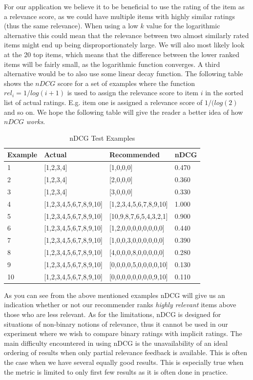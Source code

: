 For our application we believe it to be beneficial to use the rating of the item as a
relevance score, as we could have multiple items with highly similar ratings (thus the same relevance). When using a low $k$ value for the logarithmic alternative this could mean that the relevance between two almost similarly rated items might end up being disproportionately large. We will also most likely look at the 20 top items, which means that the difference between the lower ranked items will be fairly small, as the logarithmic function converges. A third alternative would be to also use some linear decay function. The following table shows the $nDCG$ score for a set of examples where the function $rel_i = 1/log(i+1)$ is used to assign the relevance score to item $i$ in the sorted list of actual ratings. E.g. item one is assigned a relevance score of $1/(log(2)$ and so on. We hope the following table will give the reader a better idea of how $nDCG$ \emph{works}.

\begin{table}[H]
\label{table:ndcg}
\centering
\begin{tabular}{*{4}l}
\toprule
Example 	& 	Actual					& 	Recommended				&	nDCG 	\\ \midrule
1			& 	[1,2,3,4]				&	[1,0,0,0]				&	0.470   \\ 
2			& 	[1,2,3,4]				&	[2,0,0,0]				&	0.360   \\ 
3			& 	[1,2,3,4]				&	[3,0,0,0]				&	0.330   \\ 
4			& 	[1,2,3,4,5,6,7,8,9,10] 	& 	[1,2,3,4,5,6,7,8,9,10] 	&   1.000	\\ 
5			& 	[1,2,3,4,5,6,7,8,9,10] 	& 	[10,9,8,7,6,5,4,3,2,1] 	&   0.900	\\ 
6			&	[1,2,3,4,5,6,7,8,9,10] 	& 	[1,2,0,0,0,0,0,0,0,0] 	&   0.440	\\ 
7			& 	[1,2,3,4,5,6,7,8,9,10] 	& 	[1,0,0,3,0,0,0,0,0,0] 	&   0.390	\\ 
8			& 	[1,2,3,4,5,6,7,8,9,10] 	& 	[4,0,0,0,8,0,0,0,0,0] 	&   0.280	\\ 
9			& 	[1,2,3,4,5,6,7,8,9,10] 	& 	[0,0,0,0,5,0,0,0,0,10] 	&   0.130	\\ 
10			& 	[1,2,3,4,5,6,7,8,9,10] 	& 	[0,0,0,0,0,0,0,0,9,10]	&   0.110	\\
\bottomrule
\end{tabular}
\caption{nDCG Test Examples}
\end{table}

As you can see from the above mentioned examples nDCG will give us an indication whether or not our recommender
ranks \emph{highly relevant} items above those who are less relevant. As for the limitations, nDCG is designed for situations of non-binary notions of relevance, thus it cannot be used in our experiment where we wish to compare binary ratings with implicit ratings. The main difficulty encountered in using nDCG is the unavailability of an ideal ordering of results when only partial relevance feedback is available. This is often the case when we have several equally good results. This is especially true when the metric is limited to only first few results as it is often done in practice.

